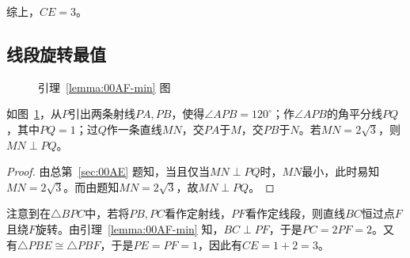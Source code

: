 综上，$CE = 3$。

\subsection{线段旋转最值} \label{subsec:00AF-min}

\begin{lemma} \label{lemma:00AF-min}
  \begin{figure}[htbp]
    \centering {}
    \caption{引理~\ref{lemma:00AF-min} 图} \label{fig:00AF-min-l}
  \end{figure}

  如图~\ref{fig:00AF-min-l}，从$P$引出两条射线$PA, PB$，使得$\angle APB = 120^\circ$；作$\angle APB$的角平分线$PQ$，其中$PQ = 1$；过$Q$作一条直线$MN$，交$PA$于$M$，交$PB$于$N$。若$MN = 2\sqrt3$，则$MN \perp PQ$。
\end{lemma}

\begin{proof}
  由总第~\ref{sec:00AE} 题知，当且仅当$MN \perp PQ$时，$MN$最小，此时易知$MN = 2\sqrt3$。而由题知$MN = 2\sqrt3$，故$MN \perp PQ$。
\end{proof}

注意到在$\triangle BPC$中，若将$PB, PC$看作定射线，$PF$看作定线段，则直线$BC$恒过点$F$且绕$F$旋转。由引理~\ref{lemma:00AF-min} 知，$BC \perp PF$，于是$PC = 2PF = 2$。又有$\triangle PBE \cong \triangle PBF$，于是$PE = PF = 1$，因此有$CE = 1 + 2 = 3$。
